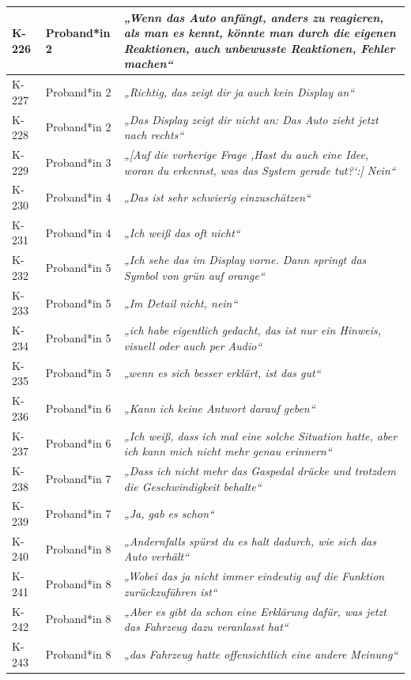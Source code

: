 {\begin{xltabular}{\textwidth}{
    |P{0.10\textwidth}
    |P{0.17\textwidth}
    |Y|
}
K-226 & Proband*in 2 & \textit{„Wenn das Auto anfängt, anders zu reagieren, als man es kennt, könnte man durch die eigenen Reaktionen, auch unbewusste Reaktionen, Fehler machen“} \\
\hline
K-227 & Proband*in 2 & \textit{„Richtig, das zeigt dir ja auch kein Display an“} \\
\hline
K-228 & Proband*in 2 & \textit{„Das Display zeigt dir nicht an: Das Auto zieht jetzt nach rechts“} \\
\hline
K-229 & Proband*in 3 & \textit{„[Auf die vorherige Frage ‚Hast du auch eine Idee, woran du erkennst, was das System gerade tut?‘:] Nein“} \\
\hline
K-230 & Proband*in 4 & \textit{„Das ist sehr schwierig einzuschätzen“} \\
\hline
K-231 & Proband*in 4 & \textit{„Ich weiß das oft nicht“} \\
\hline
K-232 & Proband*in 5 & \textit{„Ich sehe das im Display vorne. Dann springt das Symbol von grün auf orange“} \\
\hline
K-233 & Proband*in 5 & \textit{„Im Detail nicht, nein“} \\
\hline
K-234 & Proband*in 5 & \textit{„ich habe eigentlich gedacht, das ist nur ein Hinweis, visuell oder auch per Audio“} \\
\hline
K-235 & Proband*in 5 & \textit{„wenn es sich besser erklärt, ist das gut“} \\
\hline
K-236 & Proband*in 6 & \textit{„Kann ich keine Antwort darauf geben“} \\
\hline
K-237 & Proband*in 6 & \textit{„Ich weiß, dass ich mal eine solche Situation hatte, aber ich kann mich nicht mehr genau erinnern“} \\
\hline
K-238 & Proband*in 7 & \textit{„Dass ich nicht mehr das Gaspedal drücke und trotzdem die Geschwindigkeit behalte“} \\
\hline
K-239 & Proband*in 7 & \textit{„Ja, gab es schon“} \\
\hline
K-240 & Proband*in 8 & \textit{„Andernfalls spürst du es halt dadurch, wie sich das Auto verhält“} \\
\hline
K-241 & Proband*in 8 & \textit{„Wobei das ja nicht immer eindeutig auf die Funktion zurückzuführen ist“} \\
\hline
K-242 & Proband*in 8 & \textit{„Aber es gibt da schon eine Erklärung dafür, was jetzt das Fahrzeug dazu veranlasst hat“} \\
\hline
K-243 & Proband*in 8 & \textit{„das Fahrzeug hatte offensichtlich eine andere Meinung“} \\

\end{xltabular}}
